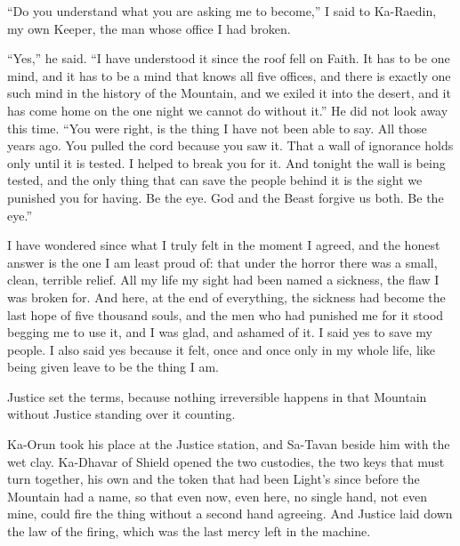 ``Do you understand what you are asking me to become,'' I said to Ka-Raedin, my own Keeper, the man whose office I had broken.\par

``Yes,'' he said. ``I have understood it since the roof fell on Faith. It has to be one mind, and it has to be a mind that knows all five offices, and there is exactly one such mind in the history of the Mountain, and we exiled it into the desert, and it has come home on the one night we cannot do without it.'' He did not look away this time. ``You were right, is the thing I have not been able to say. All those years ago. You pulled the cord because you saw it. That a wall of ignorance holds only until it is tested. I helped to break you for it. And tonight the wall is being tested, and the only thing that can save the people behind it is the sight we punished you for having. Be the eye. God and the Beast forgive us both. Be the eye.''\par

I have wondered since what I truly felt in the moment I agreed, and the honest answer is the one I am least proud of: that under the horror there was a small, clean, terrible relief. All my life my sight had been named a sickness, the flaw I was broken for. And here, at the end of everything, the sickness had become the last hope of five thousand souls, and the men who had punished me for it stood begging me to use it, and I was glad, and ashamed of it. I said yes to save my people. I also said yes because it felt, once and once only in my whole life, like being given leave to be the thing I am.\par

\ornament

Justice set the terms, because nothing irreversible happens in that Mountain without Justice standing over it counting.\par

Ka-Orun took his place at the Justice station, and Sa-Tavan beside him with the wet clay. Ka-Dhavar of Shield opened the two custodies, the two keys that must turn together, his own and the token that had been Light's since before the Mountain had a name, so that even now, even here, no single hand, not even mine, could fire the thing without a second hand agreeing. And Justice laid down the law of the firing, which was the last mercy left in the machine.\par

